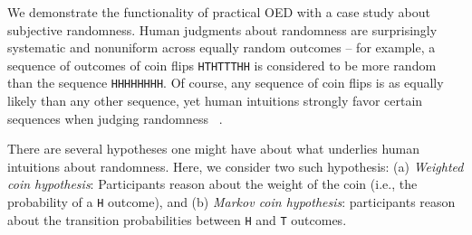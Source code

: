 \documentclass{article}
\begin{document}
We demonstrate the functionality of practical OED with a case study about subjective randomness. 
Human judgments about randomness are surprisingly systematic and nonuniform across equally random outcomes -- for example, a sequence of outcomes of coin flips \lstinline{HTHTTTHH} is considered to be more random than the sequence \lstinline{HHHHHHHH}. Of course, any sequence of coin flips is as equally likely than any other sequence, yet human intuitions strongly favor certain sequences when judging randomness ~\cite{goodfellow38:jep, griffiths01:cogsci}. 

There are several hypotheses one might have about what underlies human intuitions about randomness. Here, we consider two such hypothesis: (a) \emph{Weighted coin hypothesis}: Participants reason about the weight of the coin (i.e., the probability of a \lstinline{H} outcome), and (b) \emph{Markov coin hypothesis}: participants reason about the transition probabilities between \lstinline{H} and \lstinline{T} outcomes. 





\end{document}
